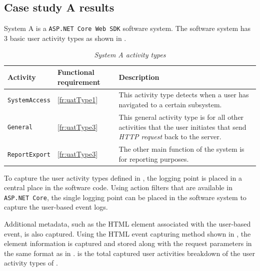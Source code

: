 \subsection{Case study A results}
System A is a \texttt{ASP.NET Core Web SDK} software system. The software system has 3 basic user activity types as shown in .

\begin{table}[!htb]
	\centering
	\caption[System A activity types]{\textit{System A activity types}}
	\label{tbl:ch3_systemAActivityTypes}
	\begin{tabularx}{\textwidth}{|X|l|X|}
		\hline \textbf{Activity} & \textbf{Functional requirement} & \textbf{Description} \\
		\hline \texttt{SystemAccess} & \ref{fr:uatType1} & \RaggedRight This activity type detects when a user has navigated to a certain subsystem. \\ 
		\hline \texttt{General} & \ref{fr:uatType3} & \RaggedRight This general activity type is for all other activities that the user initiates that send \textit{HTTP request} back to the server.  \\
		\hline \texttt{ReportExport} & \ref{fr:uatType3} & \RaggedRight The other main function of the system is for reporting purposes. \\ 
		\hline
	\end{tabularx}
\end{table}

To capture the user activity types defined in , the logging point is placed in a central place in the software code. Using action filters that are available in \texttt{ASP.NET Core}, the single logging point can be placed in the software system to capture the user-based event logs.\par Additional metadata, such as the HTML element associated with the user-based event, is also captured. Using the HTML event capturing method shown in , the element information is captured and stored along with the request parameters in the same format as in .  is the total captured user activities breakdown of the user activity types of .

